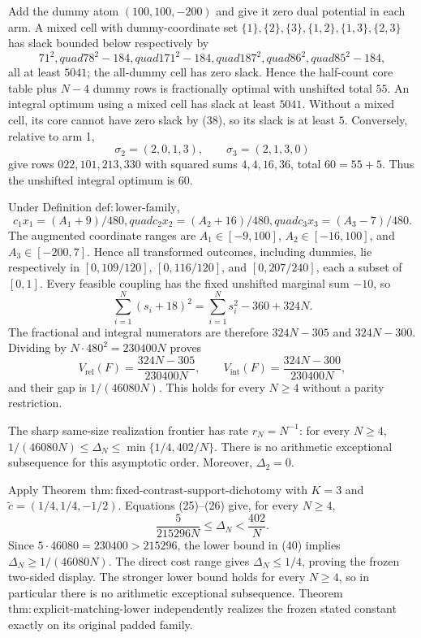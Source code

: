 Add the dummy atom \((100,100,-200)\) and give it zero dual potential in each arm.  A mixed cell with dummy-coordinate set \(\{1\},\{2\},\{3\},\{1,2\},\{1,3\},\{2,3\}\) has slack bounded below respectively by
\[
 71^2,quad78^2-184,quad171^2-184,quad187^2,quad86^2,quad85^2-184,
\]
all at least \(5041\); the all-dummy cell has zero slack.  Hence the half-count core table plus \(N-4\) dummy rows is fractionally optimal with unshifted total \(55\).  An integral optimum using a mixed cell has slack at least \(5041\).  Without a mixed cell, its core cannot have zero slack by (38), so its slack is at least \(5\).  Conversely, relative to arm 1,
\[
 \sigma_2=(2,0,1,3),\qquad \sigma_3=(2,1,3,0)
\]
give rows \(022,101,213,330\) with squared sums \(4,4,16,36\), total \(60=55+5\).  Thus the unshifted integral optimum is \(60\).

Under Definition \(\mathrm{def{:}lower\mbox{-}family}\),
\[
 c_1x_1=(A_1+9)/480,quad c_2x_2=(A_2+16)/480,quad
 c_3x_3=(A_3-7)/480.
\]
The augmented coordinate ranges are \(A_1\in[-9,100]\), \(A_2\in[-16,100]\), and \(A_3\in[-200,7]\).  Hence all transformed outcomes, including dummies, lie respectively in \([0,109/120]\), \([0,116/120]\), and \([0,207/240]\), each a subset of \([0,1]\).  Every feasible coupling has the fixed unshifted marginal sum \(-10\), so
\[
 \sum_{i=1}^N(s_i+18)^2=\sum_{i=1}^Ns_i^2-360+324N. \tag{39}
\]
The fractional and integral numerators are therefore \(324N-305\) and \(324N-300\).  Dividing by \(N\cdot480^2=230400N\) proves
\[
 V_{\mathrm{rel}}(F)=\frac{324N-305}{230400N},\qquad
 V_{\mathrm{int}}(F)=\frac{324N-300}{230400N},
\]
and their gap is \(1/(46080N)\).  This holds for every \(N\ge4\) without a parity restriction.

The sharp same-size realization frontier has rate \(r_N=N^{-1}\): for every \(N\ge4\), \(1/(46080N)\le\Delta_N\le\min\{1/4,402/N\}\).  There is no arithmetic exceptional subsequence for this asymptotic order.  Moreover, \(\Delta_2=0\).

Apply Theorem \(\mathrm{thm{:}fixed\mbox{-}contrast\mbox{-}support\mbox{-}dichotomy}\) with \(K=3\) and \(\widetilde c=(1/4,1/4,-1/2)\).  Equations (25)--(26) give, for every \(N\ge4\),
\[
 \frac{5}{215296N}\le\Delta_N<\frac{402}{N}. \tag{40}
\]
Since \(5\cdot46080=230400>215296\), the lower bound in (40) implies \(\Delta_N\ge1/(46080N)\).  The direct cost range gives \(\Delta_N\le1/4\), proving the frozen two-sided display.  The stronger lower bound holds for every \(N\ge4\), so in particular there is no arithmetic exceptional subsequence.  Theorem \(\mathrm{thm{:}explicit\mbox{-}matching\mbox{-}lower}\) independently realizes the frozen stated constant exactly on its original padded family.

